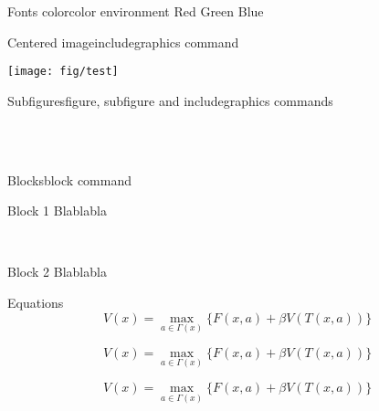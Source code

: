 \begin{frame}{Fonts color}{color environment}
    {\color{red} Red}
    {\color{green} Green}
    {\color{blue} Blue}
\end{frame}
\note{
}


\begin{frame}{Centered image}{includegraphics command}
    \begin{center}
        \texttt{[image: fig/test]}
    \end{center}
\end{frame}
\note{
}

\begin{frame}{Subfigures}{figure, subfigure and includegraphics commands}
    \begin{figure}
        \centering
        ~
        ~
        ~\\
        ~
        ~
    \end{figure}
\end{frame}
\note{
}


\begin{frame}{Blocks}{block command}
    \begin{block}{Block 1}
        Blablabla
    \end{block}

    ~\\

    \begin{block}{Block 2}
        Blablabla
    \end{block}
\end{frame}
\note{
}


\begin{frame}{Equations}
    $$
        V(x) = \max_{a \in \Gamma (x) } \{ F(x,a) + \beta V(T(x,a)) \}  \label{eq:bellman}
    $$

    \[
        V(x) = \max_{a \in \Gamma (x) } \{ F(x,a) + \beta V(T(x,a)) \}  \label{eq:bellman}
    \]

    \begin{equation}
        V(x) = \max_{a \in \Gamma (x) } \{ F(x,a) + \beta V(T(x,a)) \}  \label{eq:bellman}
    \end{equation}
\end{frame}
\note{
}



